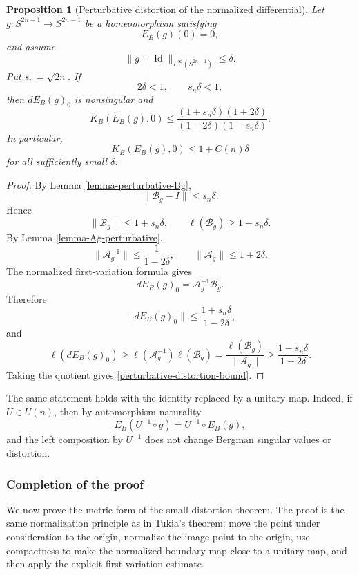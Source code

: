 \documentclass[11pt]{article}
\newtheorem{proposition}[theorem]{Proposition}
\theoremstyle{definition}
\theoremstyle{remark}
\theoremstyle{definition}
\newcommand{\Id}{\operatorname{Id}}
\begin{document}
\begin{proposition}[Perturbative distortion of the normalized differential]
\label{proposition-perturbative-distortion}
Let \(g:S^{2n-1}\to S^{2n-1}\) be a homeomorphism satisfying
\[
        E_B(g)(0)=0,
\]
and assume
\[
        \|g-\Id\|_{L^\infty(S^{2n-1})}\le\delta.
\]
Put \(s_n=\sqrt{2n}\).  If
\[
        2\delta<1,
        \qquad
        s_n\delta<1,
\]
then \(dE_B(g)_0\) is nonsingular and
\begin{equation}\label{perturbative-distortion-bound}
        K_B(E_B(g),0)
        \le
        \frac{(1+s_n\delta)(1+2\delta)}
        {(1-2\delta)(1-s_n\delta)}.
\end{equation}
In particular,
\[
        K_B(E_B(g),0)\le1+C(n)\delta
\]
for all sufficiently small \(\delta\).
\end{proposition}

\begin{proof}
By Lemma \ref{lemma-perturbative-Bg},
\[
        \|\mathcal B_g-I\|\le s_n\delta.
\]
Hence
\[
        \|\mathcal B_g\|\le1+s_n\delta,
        \qquad
        \ell(\mathcal B_g)\ge1-s_n\delta.
\]
By Lemma \ref{lemma-Ag-perturbative},
\[
        \|\mathcal A_g^{-1}\|\le\frac1{1-2\delta},
        \qquad
        \|\mathcal A_g\|\le1+2\delta.
\]
The normalized first-variation formula gives
\[
        dE_B(g)_0=\mathcal A_g^{-1}\mathcal B_g.
\]
Therefore
\[
        \|dE_B(g)_0\|
        \le
        \frac{1+s_n\delta}{1-2\delta},
\]
and
\[
        \ell(dE_B(g)_0)
        \ge
        \ell(\mathcal A_g^{-1})\ell(\mathcal B_g)
        =
        \frac{\ell(\mathcal B_g)}{\|\mathcal A_g\|}
        \ge
        \frac{1-s_n\delta}{1+2\delta}.
\]
Taking the quotient gives \eqref{perturbative-distortion-bound}.
\end{proof}

The same statement holds with the identity replaced by a unitary map.  Indeed,
if \(U\in U(n)\), then by automorphism naturality
\[
        E_B(U^{-1}\circ g)=U^{-1}\circ E_B(g),
\]
and the left composition by \(U^{-1}\) does not change Bergman singular values
or distortion.


\subsubsection{Completion of the proof}
\label{section-tukia-type-theorem}

We now prove the metric form of the small-distortion theorem.  The proof is the
same normalization principle as in Tukia's theorem: move the point under
consideration to the origin, normalize the image point to the origin, use
compactness to make the normalized boundary map close to a unitary map, and then apply the explicit first-variation estimate.
\end{document}
